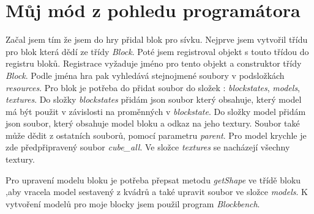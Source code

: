 \documentclass[FM,RP]{tulthesis}
\begin{document}
\chapter{Můj mód z pohledu programátora}
\par    Začal jsem tím že jsem do hry přidal blok pro sívku. Nejprve jsem vytvořil třídu pro blok která dědí ze třídy  \textit{Block}. Poté jsem  registroval objekt s touto třídou do registru bloků. Registrace vyžaduje jméno pro tento objekt a  construktor třídy \textit{Block}. Podle jména hra pak vyhledává stejnojmené soubory v podsložkách \textit{resources}.  Pro blok je potřeba do přidat soubor do složek : \textit{blockstates}, \textit{models}, \textit{textures}. Do složky \textit{blockstates} přidám json soubor který obsahuje, který model má být použit v závislosti na proměnných v \textit{blockstate}.  Do složky model přidám json soubor, který obsahuje model bloku a odkaz na jeho textury. Soubor také může dědit z ostatních souborů, pomocí parametru \textit{parent}. Pro model krychle je zde předpřipravený soubor \textit{cube_all}. Ve složce \textit{textures} se nacházejí všechny textury.
\begin{comment}
    Tímto jsem přidal do hry blok, ten ale nemá žádné funkce.
\end{comment}

 \par   Pro upravení modelu bloku je potřeba přepsat metodu \textit{getShape} ve třídě bloku ,aby vracela model sestavený z kvádrů a také upravit soubor ve složce \textit{models}. K vytvoření modelů pro moje blocky jsem použil program \textit{Blockbench}.
\end{document}
